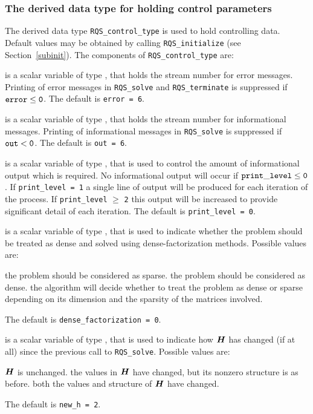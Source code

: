 \documentclass{galahad}
\newcommand{\packagename}{RQS}
\begin{document}
\subsubsection{The derived data type for holding control
 parameters}\label{typecontrol}
The derived data type
{\tt \packagename\_control\_type}
is used to hold controlling data. Default values may be obtained by calling
{\tt \packagename\_initialize}
(see Section~\ref{subinit}). The components of
{\tt \packagename\_control\_type}
are:

\begin{description}
 is a scalar variable of type \integer, that holds the
stream number for error messages.
Printing of error messages in
{\tt \packagename\_solve} and {\tt \packagename\_terminate}
is suppressed if ${\tt error} \leq {\tt 0}$.
The default is {\tt error = 6}.

 is a scalar variable of type \integer, that holds the
stream number for informational messages.
Printing of informational messages in
{\tt \packagename\_solve} is suppressed if ${\tt out} < {\tt 0}$.
The default is {\tt out = 6}.

 is a scalar variable of type \integer,
that is used
to control the amount of informational output which is required. No
informational output will occur if ${\tt print\_level} \leq {\tt 0}$. If
{\tt print\_level = 1} a single line of output will be produced for each
iteration of the process. If {\tt print\_level} $\geq$ {\tt 2} this output
will be increased to provide significant detail of each iteration.
The default is {\tt print\_level = 0}.

 is a scalar variable of type \integer,
that is used to indicate whether the problem should be treated as dense
and solved using dense-factorization methods. Possible values are:
\begin{description}
 the problem should be considered as sparse.
 the problem should be considered as dense.
 the algorithm will decide whether to treat the
problem as dense or sparse depending on its dimension and the
sparsity of the matrices involved.
\end{description}
The default is {\tt dense\_factorization = 0}.

 is a scalar variable of type \integer, that is used
to indicate how ${\bm{H}}$ has changed (if at all) since the previous call
to {\tt \packagename\_solve}. Possible values are:
\begin{description}
 ${\bm{H}}$ is unchanged.
 the values in ${\bm{H}}$ have changed, but its nonzero structure
is as before.
 both the values and structure of ${\bm{H}}$ have changed.
\end{description}
The default is {\tt new\_h = 2}.


\end{description}
\end{document}
